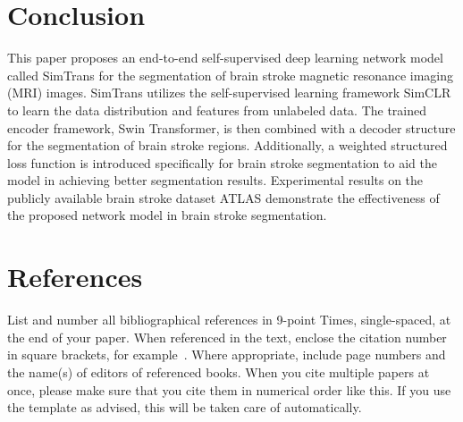 \documentclass[10pt,twocolumn,a4paper]{article}
\begin{document}

\section{Conclusion}
\label{sec:conclusion}

This paper proposes an end-to-end self-supervised deep learning network model called SimTrans for the segmentation of brain stroke magnetic resonance imaging (MRI) images. SimTrans utilizes the self-supervised learning framework SimCLR to learn the data distribution and features from unlabeled data. The trained encoder framework, Swin Transformer, is then combined with a decoder structure for the segmentation of brain stroke regions. Additionally, a weighted structured loss function is introduced specifically for brain stroke segmentation to aid the model in achieving better segmentation results. Experimental results on the publicly available brain stroke dataset ATLAS demonstrate the effectiveness of the proposed network model in brain stroke segmentation.

\section{References}
\label{sec:references}

List and number all bibliographical references in 9-point Times, single-spaced, at the end of your paper.
When referenced in the text, enclose the citation number in square brackets, for
example~.
Where appropriate, include page numbers and the name(s) of editors of referenced books.
When you cite multiple papers at once, please make sure that you cite them in numerical order like this.
If you use the template as advised, this will be taken care of automatically.



{\small


}
\end{document}

